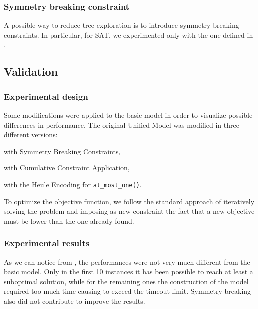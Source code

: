 \subsubsection{Symmetry breaking constraint}

A possible way to reduce tree exploration is to introduce symmetry breaking constraints. In particular, for SAT, we experimented only with the one defined in .


\subsection{Validation}

\subsubsection{Experimental design}

Some modifications were applied to the basic model in order to visualize possible differences in performance.
The original Unified Model was modified in three different versions:
\begin{enumerate*}[label=(\roman*)]
    \item with Symmetry Breaking Constraints,
    \item with Cumulative Constraint Application,
    \item with the Heule Encoding for \texttt{at\_most\_one()}.
\end{enumerate*}

To optimize the objective function, we follow the standard approach of iteratively solving the problem and imposing as new constraint the fact that a new objective must be lower than the one already found.


\subsubsection{Experimental results}

As we can notice from , the performances were not very much different from the basic model. Only in the first 10 instances it has been possible to reach at least a suboptimal solution, while for the remaining ones the construction of the model required too much time causing to exceed the timeout limit. Symmetry breaking also did not contribute to improve the results. 

